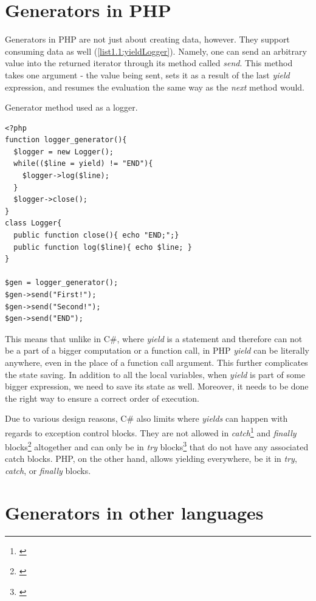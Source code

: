 \section{Generators in PHP}

Generators in PHP are not just about creating data, however. They support consuming data as well (\autoref{list1.1:yieldLogger}). Namely, one can send an arbitrary value into the returned iterator through its method called \emph{send}. This method takes one argument - the value being sent, sets it as a result of the last \emph{yield} expression, and resumes the evaluation the same way as the \emph{next} method would.

\begin{listing}[H]
	\caption{Generator method used as a logger.}
	\label{list1.1:yieldLogger}
\begin{verbatim}
<?php
function logger_generator(){
  $logger = new Logger();
  while(($line = yield) != "END"){
    $logger->log($line);
  }
  $logger->close();
}
class Logger{
  public function close(){ echo "END;";}
  public function log($line){ echo $line; }
}

$gen = logger_generator();
$gen->send("First!");
$gen->send("Second!");
$gen->send("END");
\end{verbatim}
\end{listing}

This means that unlike in C\#, where \emph{yield} is a statement and therefore can not be a part of a bigger computation or a function call, in PHP \emph{yield} can be literally anywhere, even in the place of a function call argument. This further complicates the state saving. In addition to all the local variables, when \emph{yield} is part of some bigger expression, we need to save its state as well. Moreover, it needs to be done the right way to ensure a correct order of execution.

Due to various design reasons, \citep{CSharpYieldFinaly} C\# also limits where \emph{yields} can happen with regards to exception control blocks. They are not allowed in \emph{catch}\footnote{\citep{CSharpYieldCatch}} and \emph{finally} blocks\footnote{\citep{CSharpYieldFinaly}} altogether and can only be in \emph{try} blocks\footnote{\citep{CSharpYieldTry}} that do not have any associated catch blocks. PHP, on the other hand, allows yielding everywhere, be it in \emph{try}, \emph{catch}, or \emph{finally} blocks.

\section{Generators in other languages}

